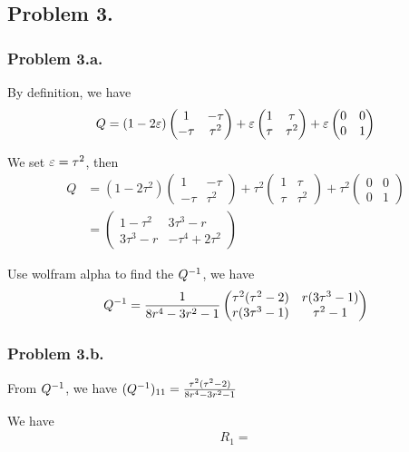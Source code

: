 

\newpage
\subsection*{Problem 3.}

\subsubsection*{Problem 3.a.}

By definition, we have
\begin{align*}
  Q =  (1-2\varepsilon)\begin{pmatrix}
    1 & -\tau \\
    -\tau & \tau^2
  \end{pmatrix}
            + \varepsilon \begin{pmatrix}
              1 & \tau \\
              \tau & \tau^2
            \end{pmatrix}
                     + \varepsilon \begin{pmatrix}
                       0 & 0 \\
                       0 & 1
                     \end{pmatrix}
\end{align*}

We set $\varepsilon = \tau^2$, then
\begin{align*}
  Q &=  (1-2\tau^2)\begin{pmatrix}
    1 & -\tau \\
    -\tau & \tau^2
  \end{pmatrix}
            + \tau^2 \begin{pmatrix}
              1 & \tau \\
              \tau & \tau^2
            \end{pmatrix}
                     + \tau^2 \begin{pmatrix}
                       0 & 0 \\
                       0 & 1
                     \end{pmatrix} \\
    &= \begin{pmatrix}
      1-\tau^2 & 3\tau^3 - r \\
      3\tau^3 - r & -\tau^4 + 2\tau^2
    \end{pmatrix}
\end{align*}

Use wolfram alpha to find the $Q^{-1}$, we have
\begin{align*}
  Q^{-1} = \frac{1}{8r^4 - 3r^2 -1} \begin{pmatrix}
    \tau^2(\tau^2 - 2) & r(3\tau^3 - 1) \\
    r(3\tau^3 - 1) & \tau^2 -  1
  \end{pmatrix}
\end{align*}

\subsubsection*{Problem 3.b.}

From $Q^{-1}$, we have $(Q^{-1})_{11} = \frac{\tau^2(\tau^2 -2)}{8r^4 - 3r^2 -1} $

We have
\begin{align*}
  R_1 = 
\end{align*}